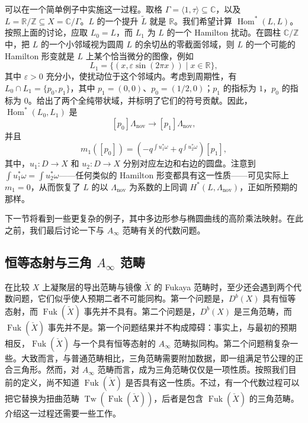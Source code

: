 \begin{example*}
可以在一个简单例子中实施这一过程。取格 $\Gamma=\langle1,\tau\rangle\subseteq\mathbb C$，以及 $L=\mathbb R/\mathbb Z\subseteq X=\mathbb C/\Gamma$。$L$ 的一个提升 $\widetilde L$ 就是 $\mathbb R$。我们希望计算 $\operatorname{Hom}^*(L,L)$。按照上面的讨论，应取 $L_0=L$，而 $L_1$ 为 $L$ 的一个 Hamilton 扰动。在圆柱 $\mathbb C/\mathbb Z$ 中，把 $L$ 的一个小邻域视为圆周 $L$ 的余切丛的零截面邻域，则 $L$ 的一个可能的 Hamilton 形变就是 $L$ 上某个恰当微分的图像，例如
\[
L_1=\{(x,\varepsilon\sin(2\pi x))\mid x\in\mathbb R\},
\]
其中 $\varepsilon>0$ 充分小，使扰动位于这个邻域内。考虑到周期性，有 $L_0\cap L_1=\{p_0,p_1\}$，其中 $p_1=(0,0)$、$p_0=(1/2,0)$；$p_1$ 的指标为 $1$，$p_0$ 的指标为 $0$。给出了两个全纯带状域，并标明了它们的符号贡献。因此，$\operatorname{Hom}^*(L_0,L_1)$ 是
\[
[p_0]\Lambda_{\mathrm{nov}}\longrightarrow[p_1]\Lambda_{\mathrm{nov}},
\]
并且
\[
m_1([p_0])=\left(-q^{\int u_1^*\omega}+q^{\int u_2^*\omega}\right)[p_1],
\]
其中，$u_1\colon D\to X$ 和 $u_2\colon D\to X$ 分别对应左边和右边的圆盘。注意到 $\int u_1^*\omega=\int u_2^*\omega$——任何类似的 Hamilton 形变都具有这一性质——可见实际上 $m_1=0$，从而恢复了 $L$ 的以 $\Lambda_{\mathrm{nov}}$ 为系数的上同调 $H^*(L,\Lambda_{\mathrm{nov}})$，正如所预期的那样。
\end{example*}

\begin{figure}[H]
\centering
{}
\BookNumberOnlyCaption\label{fig:8.23}
\end{figure}

下一节将看到一些更复杂的例子，其中多边形参与椭圆曲线的高阶乘法映射。在此之前，我们最后讨论一下与 $A_\infty$ 范畴有关的代数问题。

\subsection{恒等态射与三角 \texorpdfstring{$A_\infty$}{A∞} 范畴}\label{sec:8.3.4}

在比较 $X$ 上凝聚层的导出范畴与镜像 $\check X$ 的 Fukaya 范畴时，至少还会遇到两个代数问题，它们似乎使人预期二者不可能同构。第一个问题是，$D^b(X)$ 具有恒等态射，而 $\operatorname{Fuk}(\check X)$ 事先并不具有。第二个问题是，$D^b(X)$ 是三角范畴，而 $\operatorname{Fuk}(\check X)$ 事先并不是。第一个问题结果并不构成障碍：事实上，与最初的预期相反，$\operatorname{Fuk}(\check X)$ 与一个具有恒等态射的 $A_\infty$ 范畴拟同构。第二个问题稍复杂一些。大致而言，与普通范畴相比，三角范畴需要附加数据，即一组满足节公理的正合三角形。然而，对 $A_\infty$ 范畴而言，成为三角范畴仅仅是一项性质。按照我们目前的定义，尚不知道 $\operatorname{Fuk}(\check X)$ 是否具有这一性质。不过，有一个代数过程可以把它替换为扭曲范畴 $\operatorname{Tw}(\operatorname{Fuk}(\check X))$，后者是包含 $\operatorname{Fuk}(\check X)$ 的三角范畴。介绍这一过程还需要一些工作。

